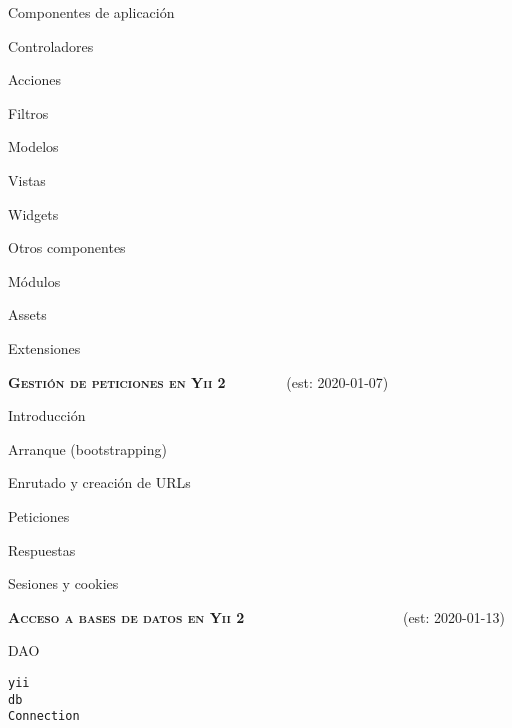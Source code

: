 \begin{longenum}
\begin{longenum}
\begin{longenum}
            \item Componentes de aplicación
            \item Controladores
            \begin{longenum}
                \item Acciones
                \item Filtros
            \end{longenum}
            \item Modelos
            \item Vistas
            \begin{longenum}
                \item Widgets
            \end{longenum}
            \item Otros componentes
            \begin{longenum}
                \item Módulos
                \item Assets
                \item Extensiones
            \end{longenum}
        \end{longenum}
    \end{longenum}
    \item \textbf{\textsc{Gestión de peticiones en Yii 2}} \ \ \ \ \ \ \ \ (est: \mbox{2020-01-07})
    \begin{longenum}
        \item Introducción
        \item Arranque (bootstrapping)
        \item Enrutado y creación de URLs
        \item Peticiones
        \item Respuestas
        \item Sesiones y cookies
    \end{longenum}
    \item \textbf{\textsc{Acceso a bases de datos en Yii 2}} \ \ \ \ \ \ \ \ \ \ \ \ \ \ \ \ \ \ \ \ \ \ (est: \mbox{2020-01-13})
    \begin{longenum}
        \item DAO
        \begin{longenum}
            \item \texttt{yii\\db\\Connection}

\end{longenum}
\end{longenum}
\end{longenum}
